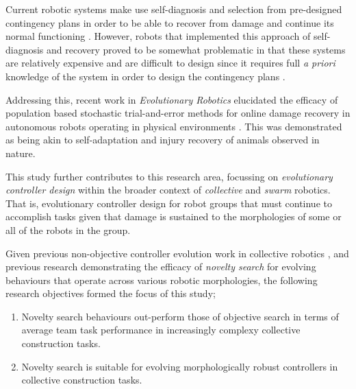 Current robotic systems make use self-diagnosis and selection from pre-designed contingency plans in order to be able to recover from damage and continue its normal functioning \cite{fenton2001fault, verma2004real, BongardZykovLipson2006}. However, robots that implemented this approach of self-diagnosis and recovery proved to be somewhat problematic in that these systems are relatively expensive and are difficult to design since it requires full \textit{a priori} knowledge of the system in order to design the contingency plans \cite{CullyCluneTaraporeMouret2015}.



Addressing this, recent work in \textit{Evolutionary Robotics} elucidated the efficacy of population based stochastic trial-and-error methods for online damage recovery in autonomous robots operating in physical environments \cite{CullyCluneTaraporeMouret2015}.
This was demonstrated as being akin to self-adaptation and injury recovery of animals observed in nature.

This study further contributes to this research area, focussing on \textit{evolutionary controller design} \cite{FloreanoDurrMattiussi2008} within the broader context of \textit{collective} \cite{KubeZhang1994B} and \textit{swarm} \cite{Beni2004} robotics.
That is, evolutionary controller design for robot groups that must continue to accomplish tasks given that damage is sustained to the morphologies of some or all of the robots in the group.



Given previous non-objective controller evolution work in collective robotics
\cite{gomes2013generic}
\cite{RefWorks:5}
\cite{RefWorks:11},
and previous research demonstrating the efficacy of \textit{novelty search} \cite{lehman2011abandoning} for evolving behaviours that operate across various robotic morphologies, the following research objectives formed the focus of this study;

\begin{enumerate}
	\item Novelty search behaviours out-perform those of objective search in terms of average team task performance in increasingly complexy collective construction tasks.
	\item Novelty search is suitable for evolving morphologically robust controllers in collective construction tasks.
\end{enumerate}


